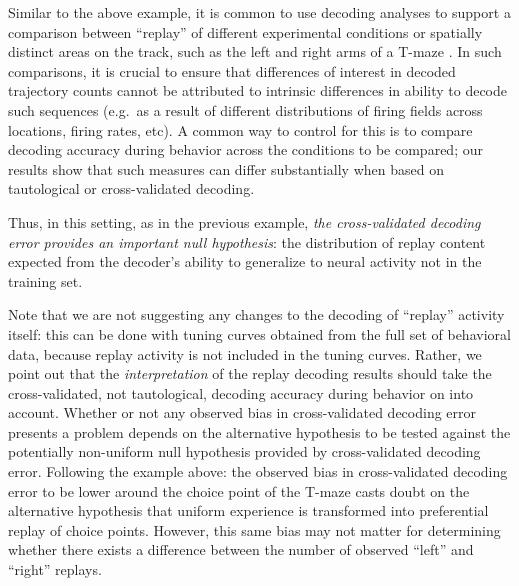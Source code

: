 \documentclass[11pt]{article}
\let\cite=\citep
\begin{document}
Similar to the above example, it is common to use decoding analyses to
support a comparison between ``replay'' of different experimental
conditions or spatially distinct areas on the track, such as the left
and right arms of a T-maze
\cite{Gupta2010,Bendor2012,Olafsdottir2015}. In such comparisons, it
is crucial to ensure that differences {\color{red} of interest} in
decoded trajectory counts cannot be attributed to intrinsic
differences in ability to decode such sequences (e.g.\ as a result of
different distributions of firing fields across locations, firing
rates, etc). A common way to control for this is to compare decoding
accuracy {\color{red} during behavior across} the conditions to be
compared; our results show that such measures can differ substantially
when based on tautological or cross-validated decoding. {\color{red}
  Thus, in this setting, as in the previous example, {\it the cross-validated
  decoding error provides an important null hypothesis}: the
  distribution of replay content expected from the decoder's ability
  to generalize to neural activity not in the training set.

Note that we are not suggesting any changes to the decoding of
``replay'' activity itself: this can be done with tuning curves
obtained from the full set of behavioral data, because replay activity
is not included in the tuning curves. Rather, we point out that the
{\it interpretation} of the replay decoding results should take the
cross-validated, not tautological, decoding accuracy during behavior
on into account. Whether or not any observed bias in cross-validated
decoding error presents a problem depends on the alternative
hypothesis to be tested against the potentially non-uniform null
hypothesis provided by cross-validated decoding error. Following the
example above: the observed bias in cross-validated decoding error to
be lower around the choice point of the T-maze casts doubt on the
alternative hypothesis that uniform experience is transformed into
preferential replay of choice points. However, this same bias may not
matter for determining whether there exists a difference between the
number of observed ``left'' and ``right'' replays.}
\end{document}
